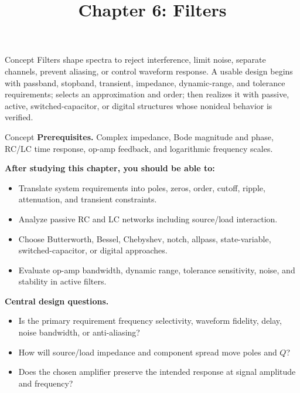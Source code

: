 \documentclass[10pt,letterpaper]{article}
\title{Chapter 6: Filters}
\author{}
\date{}
\begin{document}
\maketitle

\begin{CornellOverviewBox}{Concept}
Filters shape spectra to reject interference, limit noise, separate channels, prevent aliasing, or control waveform response. A usable design begins with passband, stopband, transient, impedance, dynamic-range, and tolerance requirements; selects an approximation and order; then realizes it with passive, active, switched-capacitor, or digital structures whose nonideal behavior is verified.
\end{CornellOverviewBox}
\begin{CornellOverviewBox}{Concept}
\textbf{Prerequisites.} Complex impedance, Bode magnitude and phase, RC/LC time response, op-amp feedback, and logarithmic frequency scales.

\textbf{After studying this chapter, you should be able to:}
\begin{itemize}
  \item Translate system requirements into poles, zeros, order, cutoff, ripple, attenuation, and transient constraints.
  \item Analyze passive RC and LC networks including source/load interaction.
  \item Choose Butterworth, Bessel, Chebyshev, notch, allpass, state-variable, switched-capacitor, or digital approaches.
  \item Evaluate op-amp bandwidth, dynamic range, tolerance sensitivity, noise, and stability in active filters.
\end{itemize}\textbf{Central design questions.}
\begin{itemize}
  \item Is the primary requirement frequency selectivity, waveform fidelity, delay, noise bandwidth, or anti-aliasing?
  \item How will source/load impedance and component spread move poles and $Q$?
  \item Does the chosen amplifier preserve the intended response at signal amplitude and frequency?
\end{itemize}\end{CornellOverviewBox}
\end{document}
